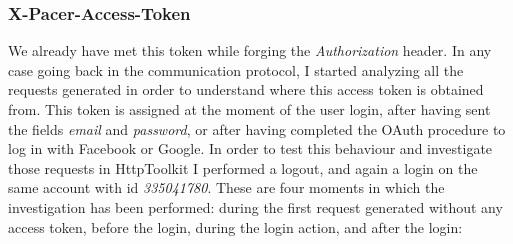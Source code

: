 		\subsubsection{X-Pacer-Access-Token}
			\par We already have met this token while forging the \textit{Authorization} header. In any case going back in the communication protocol, I started analyzing all the requests generated in order to understand where this access token is obtained from. This token is assigned at the moment of the user login, after having sent the fields \textit{email} and \textit{password}, or after having completed the OAuth procedure to log in with Facebook or Google. In order to test this behaviour and investigate those requests in HttpToolkit I performed a logout, and again a login on the same account with id \textit{335041780}. \newline
			These are four moments in which the investigation has been performed: during the first request generated without any access token, before the login, during the login action, and after the login:\newpage
